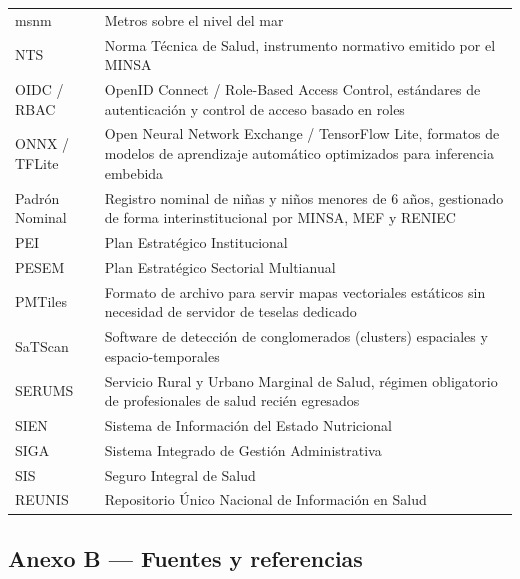 \documentclass[11pt,a4paper]{article}
\begin{document}
{\begin{longtable}[]{@{}
  >{\raggedright\arraybackslash}p{}
  >{\raggedright\arraybackslash}p{}@{}}
msnm & Metros sobre el nivel del mar \\
NTS & Norma Técnica de Salud, instrumento normativo emitido por el MINSA \\
OIDC / RBAC & OpenID Connect / Role-Based Access Control, estándares de autenticación y control de acceso basado en roles \\
ONNX / TFLite & Open Neural Network Exchange / TensorFlow Lite, formatos de modelos de aprendizaje automático optimizados para inferencia embebida \\
Padrón Nominal & Registro nominal de niñas y niños menores de 6 años, gestionado de forma interinstitucional por MINSA, MEF y RENIEC \\
PEI & Plan Estratégico Institucional \\
PESEM & Plan Estratégico Sectorial Multianual \\
PMTiles & Formato de archivo para servir mapas vectoriales estáticos sin necesidad de servidor de teselas dedicado \\
SaTScan & Software de detección de conglomerados (clusters) espaciales y espacio-temporales \\
SERUMS & Servicio Rural y Urbano Marginal de Salud, régimen obligatorio de profesionales de salud recién egresados \\
SIEN & Sistema de Información del Estado Nutricional \\
SIGA & Sistema Integrado de Gestión Administrativa \\
SIS & Seguro Integral de Salud \\
REUNIS & Repositorio Único Nacional de Información en Salud \\
\end{longtable}
}

\subsection{Anexo B --- Fuentes y referencias}\label{anexo-b-fuentes-y-referencias}
\end{document}
